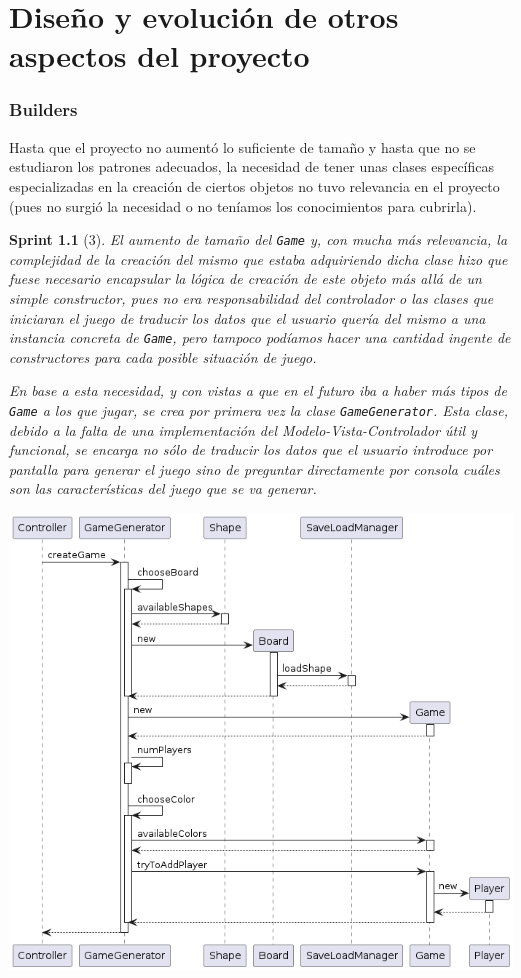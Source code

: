 \documentclass[12pt,a4paper,openright]{book}
\theoremstyle{break}
\newtheorem*{sprint}{Sprint}
\begin{document}
\chapter{Diseño y evolución de otros aspectos del proyecto}

\subsection{Builders}
Hasta que el proyecto no aumentó lo suficiente de tamaño y hasta que no se estudiaron los patrones adecuados, la necesidad de tener unas clases específicas especializadas en la creación de ciertos objetos no tuvo relevancia en el proyecto (pues no surgió la necesidad o no teníamos los conocimientos para cubrirla).

\begin{sprint}[3]
El aumento de tamaño del \texttt{Game} y, con mucha más relevancia, la complejidad de la creación del mismo que estaba adquiriendo dicha clase hizo que fuese necesario encapsular la lógica de creación de este objeto más allá de un simple constructor, pues no era responsabilidad del controlador o las clases que iniciaran el juego de traducir los datos que el usuario quería del mismo a una instancia concreta de \texttt{Game}, pero tampoco podíamos hacer una cantidad ingente de constructores para cada posible situación de juego.

En base a esta necesidad, y con vistas a que en el futuro iba a haber más tipos de \texttt{Game} a los que jugar, se crea por primera vez la clase \texttt{GameGenerator}. Esta clase, debido a la falta de una implementación del \textit{Modelo-Vista-Controlador} útil y funcional, se encarga no sólo de traducir los datos que el usuario introduce por pantalla para generar el juego sino de preguntar directamente por consola cuáles son las características del juego que se va generar.

\begin{center}
\includegraphics[scale=0.5]{Builders_sprint3_seq}
\end{center}


\end{sprint}
\end{document}
